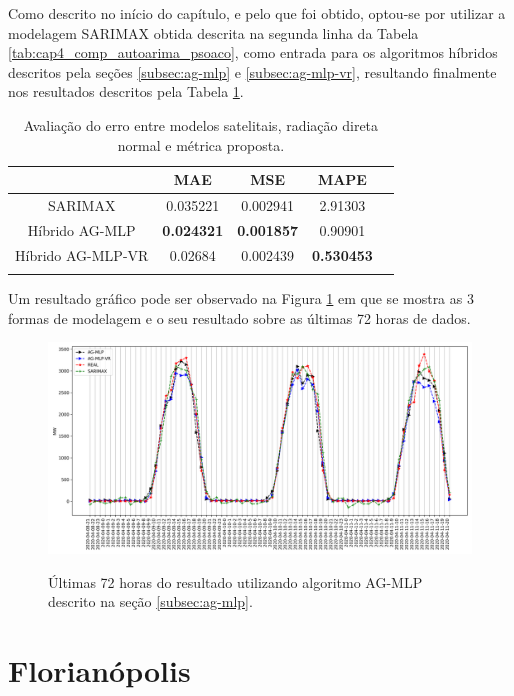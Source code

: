 Como descrito no início do capítulo, e pelo que foi obtido, optou-se por utilizar a modelagem SARIMAX obtida descrita na segunda linha da Tabela \ref{tab:cap4_comp_autoarima_psoaco}, como entrada para os algoritmos híbridos descritos pela seções \ref{subsec:ag-mlp} e \ref{subsec:ag-mlp-vr}, resultando finalmente nos resultados descritos pela Tabela \ref{tab:cap4_comp_agmlp_agmlpvr}.

\begin{table}[htbp]
\caption{Avaliação do erro entre modelos satelitais, radiação direta normal e métrica proposta.}
\begin{center}
\begin{tabular}{ccccc}
                & MAE & MSE & MAPE \\\hline
SARIMAX         & 0.035221 & 0.002941 & 2.91303 \\\hline
Híbrido AG-MLP  & \textbf{0.024321} & \textbf{0.001857} & 0.90901 \\\hline
Híbrido AG-MLP-VR & 0.02684 & 0.002439 & \textbf{0.530453} \\\hline
\label{tab:cap4_comp_agmlp_agmlpvr}
\end{tabular}
\end{center}
\end{table}

Um resultado gráfico pode ser observado na Figura \ref{fig:cap4_maceio_3_days_hibrids} em que se mostra as 3 formas de modelagem e o seu resultado sobre as últimas 72 horas de dados.

\begin{figure}[!htbp]
    \centering
    \caption{Últimas 72 horas do resultado utilizando algoritmo AG-MLP descrito na seção \ref{subsec:ag-mlp}.}
    \includegraphics[width=\textwidth]{Figuras/cap4/comparison_hibrids.png}
    \label{fig:cap4_maceio_3_days_hibrids}
\end{figure}

\section{Florianópolis}

